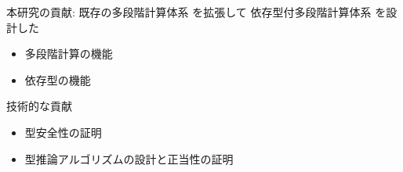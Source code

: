 \documentclass[dvipdfmx,aspectratio=169, 20pt]{beamer}
\begin{document}
\begin{frame}[fragile]{本研究の貢献: \LMD}
    既存の多段階計算体系  を拡張して
    依存型付多段階計算体系 \LMD を設計した
    \begin{itemize}
        \item 多段階計算の機能
        \item 依存型の機能
    \end{itemize}
    技術的な貢献
    \begin{itemize}
        \item 型安全性の証明
        \item 型推論アルゴリズムの設計と正当性の証明
    \end{itemize}
\end{frame}




\end{document}
